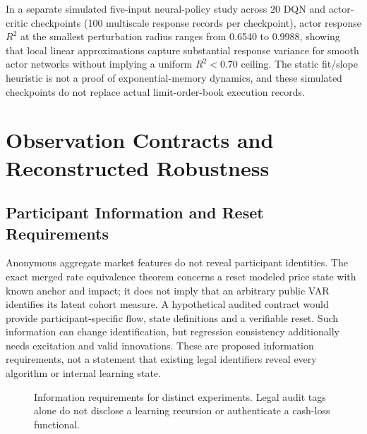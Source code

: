 \documentclass[12pt]{article}
\theoremstyle{definition}
\theoremstyle{remark}
\begin{document}
In a separate simulated five-input neural-policy study across 20 DQN and actor-critic checkpoints (100 multiscale response records per checkpoint), actor response $R^2$ at the smallest perturbation radius ranges from 0.6540 to 0.9988, showing that local linear approximations capture substantial response variance for smooth actor networks without implying a uniform $R^2 < 0.70$ ceiling. The static fit/slope heuristic is not a proof of exponential-memory dynamics, and these simulated checkpoints do not replace actual limit-order-book execution records.

\section{Observation Contracts and Reconstructed Robustness}
\label{sec:surveillance}
\subsection{Participant Information and Reset Requirements}
Anonymous aggregate market features do not reveal participant identities. The exact merged rate equivalence theorem concerns a reset modeled price state with known anchor and impact; it does not imply that an arbitrary public VAR identifies its latent cohort measure. A hypothetical audited contract would provide participant-specific flow, state definitions and a verifiable reset. Such information can change identification, but regression consistency additionally needs excitation and valid innovations. These are proposed information requirements, not a statement that existing legal identifiers reveal every algorithm or internal learning state.

\begin{figure}[htbp]\centering
{}
\caption{Information requirements for distinct experiments. Legal audit tags alone do not disclose a learning recursion or authenticate a cash-loss functional.}
\label{fig:surveillance_contracts}\end{figure}
\end{document}
